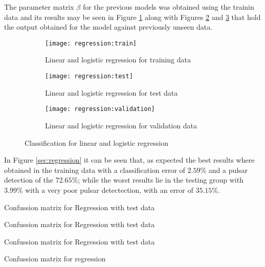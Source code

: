 \documentclass[journal]{IEEEtran}
\begin{document}
The parameter matrix $\beta$ for the previous models was obtained using the
trainin data and its results may be seen in Figure \ref{fig:regression:train}
along with Figures \ref{fig:regression:test} and \ref{fig:regression:validation}
that hold the output obtained for the model against previously unseen data.

\begin{figure}[ht]
    \begin{subfigure}[b]{\linewidth}
        \texttt{[image: regression:train]}
        \caption{Linear and logistic regression for training data
        \label{fig:regression:train}}
    \end{subfigure}
    \begin{subfigure}[b]{\linewidth}
        \texttt{[image: regression:test]}
        \caption{Linear and logistic regression for test data
        \label{fig:regression:test}}
    \end{subfigure}
    \begin{subfigure}[b]{\linewidth}
        \texttt{[image: regression:validation]}
        \caption{Linear and logistic regression for validation data
        \label{fig:regression:validation}}
    \end{subfigure}
    \caption{Classification for linear and logistic regression
        \label{fig:regression}}
\end{figure}

In Figure \ref{sec:regression} it can be seen that, as expected the best results
where obtained in the training data with a classification error of $2.59\%$ and
a pulsar detection of the $72.65\%$; while the worst results lie in the testing
group with $3.99\%$ with a very poor pulsar detectection, with an error of
$35.15\%$.

\begin{table}
    \begin{subtable}{\linewidth}
        \centering
        \caption{Confussion matrix for Regression with test data\label{tab:regression:CM:train}}
        \vspace{2.5ex}
    \end{subtable}
    \begin{subtable}{\linewidth}
        \centering
        \caption{Confussion matrix for Regression with test data\label{tab:regression:CM:test}}
        \vspace{2.5ex}
    \end{subtable}
    \begin{subtable}{\linewidth}
        \centering
        \caption{Confussion matrix for Regression with test data\label{tab:regression:CM:validation}}
    \end{subtable}
    \caption{Confussion matrix for regression}
\end{table}
\end{document}
